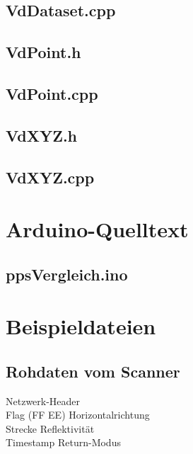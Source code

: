 \documentclass[a4paper,12pt,bibliography=totoc, listof=totoc,titlepage,pointlessnumbers]{scrreprt}
\begin{document}
\begin{appendices}
\section{VdDataset.cpp}
\label{a:VdDataset.cpp}


\section{VdPoint.h}
\label{a:VdPoint.h}


\section{VdPoint.cpp}
\label{a:VdPoint.cpp}


\section{VdXYZ.h}
\label{a:VdXYZ.h}


\section{VdXYZ.cpp}
\label{a:VdXYZ.cpp}


\chapter{Arduino-Quelltext}
\section{ppsVergleich.ino}
\label{a:ppsVergleich.ino}


\chapter{Beispieldateien}

\section{Rohdaten vom Scanner}
\label{a:Rohdaten}

{\color{gray} Netzwerk-Header}\\
{\color{red} Flag (FF EE)} {\color{green} Horizontalrichtung}\\
{\color{blue} Strecke} {\color{orange} Reflektivität}\\
{\color{yellow} Timestamp } {\color{violet} Return-Modus}\\
\\


\end{appendices}
\end{document}
